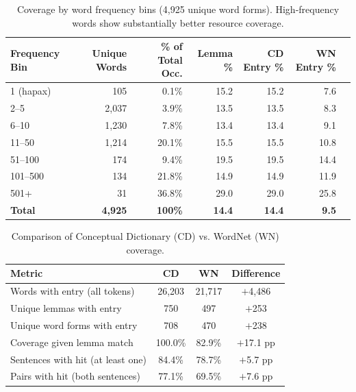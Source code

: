 \documentclass{article}
\begin{document}
\begin{table}[htbp]
\centering
\caption{Coverage by word frequency bins (4,925 unique word forms). High-frequency words show substantially better resource coverage.}
\label{tab:frequency-bins}
\begin{tabular}{lrrrrrr}
\toprule
Frequency Bin & Unique Words & \% of Total Occ. & Lemma \% & CD Entry \% & WN Entry \% \\
\midrule
1 (hapax) & 105 & 0.1\% & 15.2 & 15.2 & 7.6 \\
2--5 & 2,037 & 3.9\% & 13.5 & 13.5 & 8.3 \\
6--10 & 1,230 & 7.8\% & 13.4 & 13.4 & 9.1 \\
11--50 & 1,214 & 20.1\% & 15.5 & 15.5 & 10.8 \\
51--100 & 174 & 9.4\% & 19.5 & 19.5 & 14.4 \\
101--500 & 134 & 21.8\% & 14.9 & 14.9 & 11.9 \\
501+ & 31 & 36.8\% & 29.0 & 29.0 & 25.8 \\
\midrule
\textbf{Total} & \textbf{4,925} & \textbf{100\%} & \textbf{14.4} & \textbf{14.4} & \textbf{9.5} \\
\bottomrule
\end{tabular}
\end{table}

\begin{table}[htbp]
\centering
\caption{Comparison of Conceptual Dictionary (CD) vs. WordNet (WN) coverage.}
\label{tab:cd-vs-wn}
\begin{tabular}{lccc}
\toprule
Metric & CD & WN & Difference \\
\midrule
Words with entry (all tokens) & 26,203 & 21,717 & $+$4,486 \\
Unique lemmas with entry & 750 & 497 & $+$253 \\
Unique word forms with entry & 708 & 470 & $+$238 \\
Coverage given lemma match & 100.0\% & 82.9\% & $+$17.1 pp \\
Sentences with hit (at least one) & 84.4\% & 78.7\% & $+$5.7 pp \\
Pairs with hit (both sentences) & 77.1\% & 69.5\% & $+$7.6 pp \\
\bottomrule
\end{tabular}
\end{table}
\end{document}
